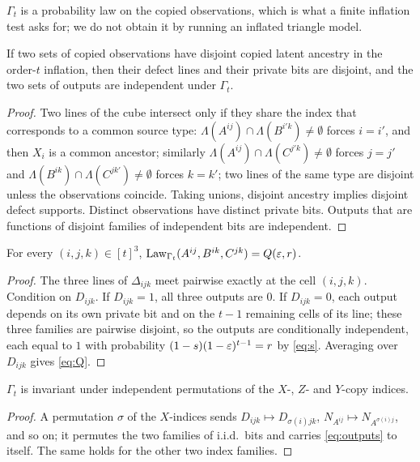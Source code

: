 $\Gamma_t$ is a probability law on the copied observations, which is what a finite inflation test asks for; we do not obtain it by running an inflated triangle model.



\begin{lemma}\label{lem:disjoint}
If two sets of copied observations have disjoint copied latent ancestry in the order-$t$ inflation, then their defect lines and their private bits are disjoint, and the two sets of outputs are independent under $\Gamma_t$.
\end{lemma}
\begin{proof}
Two lines of the cube intersect only if they share the index that corresponds to a common source type: $\Lambda(A^{ij})\cap\Lambda(B^{i'k})\ne\emptyset$ forces $i=i'$, and then $X_i$ is a common ancestor; similarly $\Lambda(A^{ij})\cap\Lambda(C^{j'k})\ne\emptyset$ forces $j=j'$ and $\Lambda(B^{ik})\cap\Lambda(C^{jk'})\ne\emptyset$ forces $k=k'$; two lines of the same type are disjoint unless the observations coincide. Taking unions, disjoint ancestry implies disjoint defect supports. Distinct observations have distinct private bits. Outputs that are functions of disjoint families of independent bits are independent.
\end{proof}

\begin{lemma}\label{lem:triangle-law}
For every $(i,j,k)\in[t]^3$, $\operatorname{Law}_{\Gamma_t}(A^{ij},B^{ik},C^{jk})=Q(\varepsilon,r)$.
\end{lemma}
\begin{proof}
The three lines of $\Delta_{ijk}$ meet pairwise exactly at the cell $(i,j,k)$. Condition on $D_{ijk}$. If $D_{ijk}=1$, all three outputs are $0$. If $D_{ijk}=0$, each output depends on its own private bit and on the $t-1$ remaining cells of its line; these three families are pairwise disjoint, so the outputs are conditionally independent, each equal to $1$ with probability $(1-s)(1-\varepsilon)^{t-1}=r$ by \eqref{eq:s}. Averaging over $D_{ijk}$ gives \eqref{eq:Q}.
\end{proof}

\begin{lemma}[Symmetry]\label{lem:symmetry}
$\Gamma_t$ is invariant under independent permutations of the $X$-, $Z$- and $Y$-copy indices.
\end{lemma}
\begin{proof}
A permutation $\sigma$ of the $X$-indices sends $D_{ijk}\mapsto D_{\sigma(i)jk}$, $N_{A^{ij}}\mapsto N_{A^{\sigma(i)j}}$, and so on; it permutes the two families of i.i.d.\ bits and carries \eqref{eq:outputs} to itself. The same holds for the other two index families.
\end{proof}
